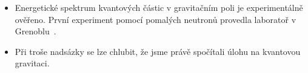 \begin{solution}
\begin{itemize}
        \item
            Energetické spektrum kvantových částic v gravitačním poli je experimentálně ověřeno.
            První experiment pomocí pomalých neutronů provedla laboratoř v Grenoblu~\cite{Nesvizhevsky2002}.

        \item
            Při troše nadsázky se lze chlubit, že jsme právě spočítali úlohu na kvantovou gravitaci.
    \end{itemize}
\end{solution}

